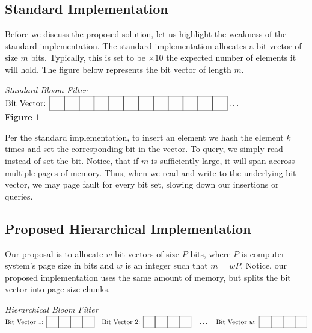 \newcommand{\sep}{\hspace*{0.15in}}
\newcommand\cell{%
    \fbox{\rule{0.15in}{0pt}\rule[-0.5ex]{0pt}{0.15in}}}

\subsection{Standard Implementation}
Before we discuss the proposed solution, let us highlight the weakness of the standard implementation.
The standard implementation allocates a bit vector of size $m$ bits. Typically, this is set to be $\times 10$ the expected number of elements it will hold.
The figure below represents the bit vector of length $m$.

\begin{center}
    \textit{Standard Bloom Filter}
    \vspace{10pt}\\
    $\text{Bit Vector: } \cell\cell\cell\cell\cell\cell\cell\cell\cell\cell\cell\cell \ldots$
    \vspace{10pt}\\
    \textbf{Figure 1}
\end{center}

Per the standard implementation, to insert an element we hash the element $k$ times and set the corresponding bit in the vector.
To query, we simply read instead of set the bit.
Notice, that if $m$ is sufficiently large, it will span accross multiple pages of memory. 
Thus, when we read and write to the underlying bit vector, we may page fault for every bit set, slowing down our insertions or queries.

\subsection{Proposed Hierarchical Implementation}
Our proposal is to allocate $w$ bit vectors of size $P$ bits, where $P$ is computer system's page size in bits and $w$ is an integer such that $m = w P$.
Notice, our proposed implementation uses the same amount of memory, but  splits the bit vector into page size chunks.

\begin{center}
    \textit{Hierarchical Bloom Filter}
    \vspace{10pt}\\
    $\text{Bit Vector 1: }\cell\cell\cell\cell \sep \text{Bit Vector 2: }\cell\cell\cell\cell \sep \ldots \sep \text{Bit Vector $w$: }\cell\cell\cell\cell$
    \vspace{10pt}\\
\end{center}

